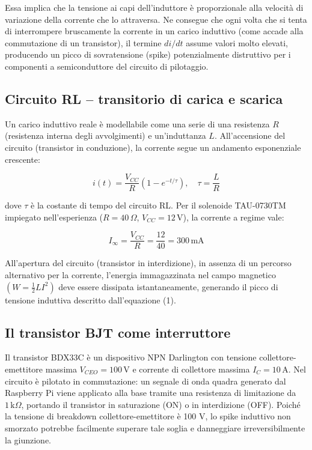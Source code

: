 \documentclass{article}
\begin{document}
    \noindent Essa implica che la tensione ai capi dell'induttore è proporzionale alla velocità di variazione della corrente che lo
    attraversa. Ne consegue che ogni volta che si tenta di interrompere bruscamente la corrente in un carico induttivo
    (come accade alla commutazione di un transistor), il termine $di/dt$ assume valori molto elevati, producendo un picco di
    sovratensione (spike) potenzialmente distruttivo per i componenti a semiconduttore del circuito di pilotaggio.

    \subsection{Circuito RL -- transitorio di carica e scarica}
        Un carico induttivo reale è modellabile come una serie di una resistenza $R$ (resistenza interna degli avvolgimenti)
        e un'induttanza $L$. All'accensione del circuito (transistor in conduzione), la corrente segue un andamento esponenziale
        crescente:
        
        \begin{equation}
            \boxed{i(t) = \frac{V_{CC}}{R}\left(1 - e^{-t/\tau}\right), \quad \tau = \frac{L}{R}}
        \end{equation}
        
        \noindent dove $\tau$ è la costante di tempo del circuito RL. Per il solenoide TAU-0730TM impiegato nell'esperienza ($R = 40\,\Omega$,
        $V_{CC} = 12\,\text{V}$), la corrente a regime vale:
        
        \begin{equation*}
            \boxed{I_\infty = \frac{V_{CC}}{R} = \frac{12}{40} = 300\,\text{mA}}
        \end{equation*}
        
        \noindent All'apertura del circuito (transistor in interdizione), in assenza di un percorso alternativo per la corrente, l'energia
        immagazzinata nel campo magnetico $\left(W = \frac{1}{2}LI^2\right)$ deve essere dissipata istantaneamente, generando il picco
        di tensione induttiva descritto dall'equazione (1).
    \newpage
    \subsection{Il transistor BJT come interruttore}
        Il transistor BDX33C è un dispositivo NPN Darlington con tensione collettore-emettitore massima $V_{CEO} = 100\,\text{V}$ e
        corrente di collettore massima $I_C = 10\,\text{A}$. Nel circuito è pilotato in commutazione: un segnale di onda quadra generato
        dal Raspberry Pi viene applicato alla base tramite una resistenza di limitazione da $1\,\text{k}\Omega$, portando il transistor
        in saturazione (ON) o in interdizione (OFF). Poiché la tensione di breakdown collettore-emettitore è 100 V, lo spike induttivo non
        smorzato potrebbe facilmente superare tale soglia e danneggiare irreversibilmente la giunzione.
\end{document}
